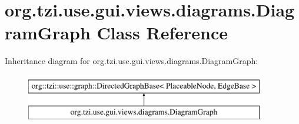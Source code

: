 \hypertarget{classorg_1_1tzi_1_1use_1_1gui_1_1views_1_1diagrams_1_1_diagram_graph}{\section{org.\-tzi.\-use.\-gui.\-views.\-diagrams.\-Diagram\-Graph Class Reference}
\label{classorg_1_1tzi_1_1use_1_1gui_1_1views_1_1diagrams_1_1_diagram_graph}
}
Inheritance diagram for org.\-tzi.\-use.\-gui.\-views.\-diagrams.\-Diagram\-Graph\-:\begin{figure}[H]
\begin{center}
\leavevmode
\includegraphics[height=2.000000cm]{classorg_1_1tzi_1_1use_1_1gui_1_1views_1_1diagrams_1_1_diagram_graph}
\end{center}
\end{figure}
